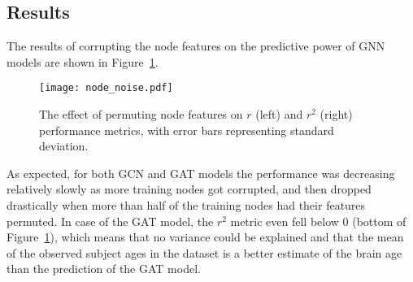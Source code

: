 \subsection{Results}

The results of corrupting the node features on the predictive power of GNN models are shown in Figure~\ref{figure:node-noise}.



\begin{figure}[h]
    \centering
    \texttt{[image: node\_noise.pdf]}
    \caption{The effect of permuting node features on $r$ (left) and $r^2$ (right) performance metrics, with error bars representing standard deviation.}\label{figure:node-noise}
\end{figure}

As expected, for both GCN and GAT models the performance was decreasing relatively slowly as more training nodes got corrupted, and then dropped drastically when more than half of the training nodes had their features permuted. In case of the GAT model, the $r^2$ metric even fell below 0 (bottom of Figure~\ref{figure:node-noise}), which means that no variance could be explained and that the mean of the observed subject ages in the dataset is a better estimate of the brain age than the prediction of the GAT model. 



